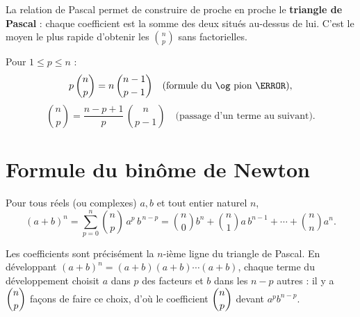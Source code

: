 \begin{aretenir}
La relation de Pascal permet de construire de proche en proche le \textbf{triangle de Pascal} : chaque coefficient est la somme des deux situés au-dessus de lui. C'est le moyen le plus rapide d'obtenir les $\binom np$ sans factorielles.
\end{aretenir}

\begin{illus}
\end{illus}

\begin{propriete}
Pour $1\le p\le n$ :
\[
p\,\binom np=n\,\binom{n-1}{p-1}\quad\text{(formule du \og pion \fg)},
\]
\[
\binom np=\frac{n-p+1}{p}\,\binom{n}{p-1}\quad\text{(passage d'un terme au suivant)}.
\]
\end{propriete}

\section{Formule du binôme de Newton}

\begin{theoreme}
Pour tous réels (ou complexes) $a,b$ et tout entier naturel $n$,
\[
(a+b)^{n}=\sum_{p=0}^{n}\binom np\,a^{p}\,b^{\,n-p}
=\binom n0 b^{n}+\binom n1 a\,b^{n-1}+\cdots+\binom nn a^{n}.
\]
\end{theoreme}

\begin{remarque}
Les coefficients sont précisément la $n$-ième ligne du triangle de Pascal. En développant
$(a+b)^{n}=(a+b)(a+b)\cdots(a+b)$, chaque terme du développement choisit $a$ dans $p$ des
facteurs et $b$ dans les $n-p$ autres : il y a $\dbinom np$ façons de faire ce choix, d'où
le coefficient $\dbinom np$ devant $a^{p}b^{n-p}$.
\end{remarque}

